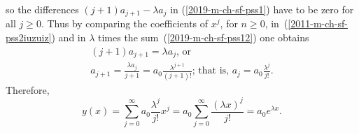 {so the differences $(j+1)a_{j+1} -\lambda a_j$
in (\ref{2019-m-ch-sf-pss1}) have to be zero for all $j\ge 0$.
Thus by comparing the coefficients of $x^j$,  for $n\ge 0$,
in~(\ref{2011-m-ch-sf-pss2iuzuiz}) and in $\lambda$ times the sum~(\ref{2019-m-ch-sf-pss12}) one obtains
\begin{equation}
\begin{split}
(j+1)a_{j+1}= \lambda   a_j\textrm{, or }\\
a_{j+1}= \frac{\lambda   a_j}{j+1} =a_0 \frac{\lambda ^{j+1}}{(j+1)!}\textrm{; that is, }
a_{j }= a_0 \frac{\lambda ^{j }}{j!}
 .
\end{split}
\end{equation}
Therefore,
\begin{equation}
y(x)=\sum_{j=0}^\infty a_0 \frac{\lambda ^{j }}{j!} x^j=a_0 \sum_{j=0}^\infty \frac{(\lambda  x)^{j }}{j!} =a_0 e^{\lambda  x}.
\end{equation}

\eexample
}

